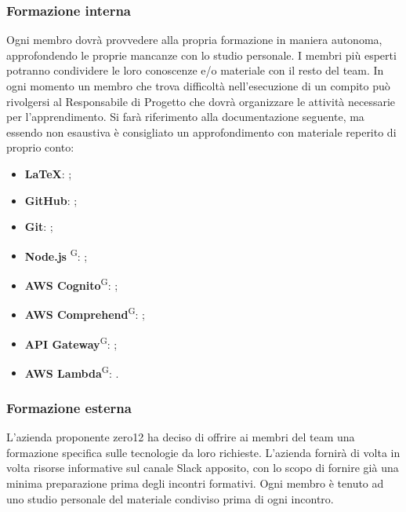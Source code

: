 \subsubsection{Formazione interna}
Ogni membro dovrà provvedere alla propria formazione in maniera autonoma, approfondendo le proprie mancanze con lo studio personale. I membri più esperti potranno condividere le loro conoscenze e/o materiale con il resto del team. In ogni momento un membro che trova difficoltà nell'esecuzione di un compito può rivolgersi al Responsabile di Progetto che dovrà organizzare le attività necessarie per l'apprendimento. Si farà riferimento alla documentazione seguente, ma essendo non esaustiva è consigliato un approfondimento con materiale reperito di proprio conto:
\begin{itemize}
\item \textbf{\LaTeX}: ;
\item \textbf{GitHub}: ;
\item \textbf{Git}: ;
\item \textbf{Node.js} \textsuperscript{G}: ;
\item \textbf{AWS Cognito}\textsuperscript{G}: ;
\item \textbf{AWS Comprehend}\textsuperscript{G}: ;
\item \textbf{API Gateway}\textsuperscript{G}: ;
\item \textbf{AWS Lambda}\textsuperscript{G}: .
\end{itemize}

\subsubsection{Formazione esterna}
L'azienda proponente zero12 ha deciso di offrire ai membri del team una formazione specifica sulle tecnologie da loro richieste. L'azienda fornirà di volta in volta risorse informative sul canale Slack apposito, con lo scopo di fornire già una minima preparazione prima degli incontri formativi. Ogni membro è tenuto ad uno studio personale del materiale condiviso prima di ogni incontro.


